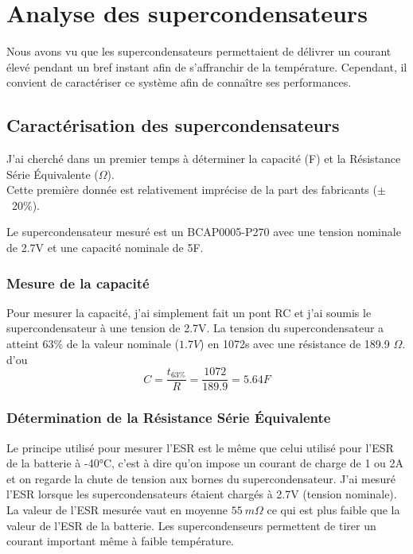 \newpage
\section{Analyse des supercondensateurs}

Nous avons vu que les supercondensateurs permettaient de délivrer un courant élevé pendant un bref instant afin de s'affranchir de la température. Cependant, il convient de caractériser ce système afin de connaître ses performances.

\subsection{Caractérisation des supercondensateurs}

J'ai cherché dans un premier temps à déterminer la capacité (F) et la Résistance Série Équivalente ($\Omega$).\\ Cette première donnée est relativement imprécise de la part des fabricants ($\pm$~20\%).

Le supercondensateur mesuré est un BCAP0005-P270 avec une tension nominale de 2.7V et une capacité nominale de 5F.

\subsubsection{Mesure de la capacité}

Pour mesurer la capacité, j'ai simplement fait un pont RC et j'ai soumis le supercondensateur à une tension de 2.7V. 
La tension du supercondensateur a atteint 63\% de la valeur nominale ($1.7V$) en 1072s avec une résistance de 189.9 $\Omega$.
d'ou 
$$ C = \frac{t_{63\%}}{R} = \frac{1072}{189.9} = 5.64 F$$

\subsubsection{Détermination de la Résistance Série Équivalente}


Le principe utilisé pour mesurer l'ESR est le même que celui utilisé pour l'ESR de la batterie à -40°C, c'est à dire qu'on impose un courant de charge de 1 ou 2A et on regarde la chute de tension aux bornes du supercondensateur. J'ai mesuré l'ESR lorsque les supercondensateurs étaient chargés à 2.7V (tension nominale).\\
La valeur de l'ESR mesurée vaut en moyenne $55~ m\Omega$ ce qui est plus faible que la valeur de l'ESR de la batterie. Les supercondenseurs permettent de tirer un courant important même à faible température.\\

